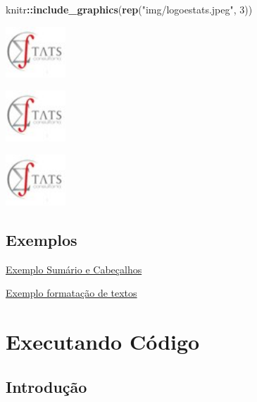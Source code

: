\documentclass[
]{book}
\newenvironment{Shaded}{\begin{snugshade}}{\end{snugshade}}
\newcommand{\DecValTok}[1]{\textcolor[rgb]{0.00,0.00,0.81}{#1}}
\newcommand{\KeywordTok}[1]{\textcolor[rgb]{0.13,0.29,0.53}{\textbf{#1}}}
\newcommand{\NormalTok}[1]{#1}
\newcommand{\OperatorTok}[1]{\textcolor[rgb]{0.81,0.36,0.00}{\textbf{#1}}}
\newcommand{\StringTok}[1]{\textcolor[rgb]{0.31,0.60,0.02}{#1}}
\begin{document}
\begin{Shaded}
\begin{Highlighting}[]
\NormalTok{knitr}\OperatorTok{::}\KeywordTok{include\_graphics}\NormalTok{(}\KeywordTok{rep}\NormalTok{(}\StringTok{"img/logoestats.jpeg"}\NormalTok{, }\DecValTok{3}\NormalTok{))}
\end{Highlighting}
\end{Shaded}

\begin{center}\includegraphics[width=0.89in]{img/logoestats} \end{center}

\begin{center}\includegraphics[width=0.89in]{img/logoestats} \end{center}

\begin{center}\includegraphics[width=0.89in]{img/logoestats} \end{center}

\hypertarget{exemplos}{%
\section{Exemplos}\label{exemplos}}

\href{exemplos/102-sumario_e_cabecalho.html}{Exemplo Sumário e Cabeçalhos}

\href{exemplos/103-formatacao_de_texto.html}{Exemplo formatação de textos}

\hypertarget{executando-cuxf3digo}{%
\chapter{Executando Código}\label{executando-cuxf3digo}}

\hypertarget{introduuxe7uxe3o}{%
\section{Introdução}\label{introduuxe7uxe3o}}
\end{document}
